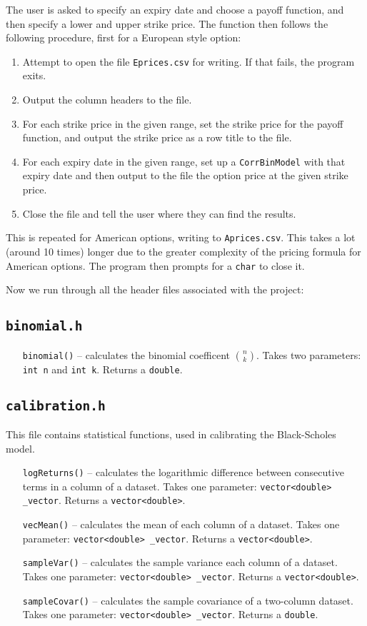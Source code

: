 \documentclass[12pt,a4paper]{article}
\begin{document}
The user is asked to specify an expiry date and choose a payoff function, and 
then specify a lower and upper strike price. The function then follows the 
following procedure, first for a European style option: 
\begin{enumerate}
	\item Attempt to open the file \texttt{Eprices.csv} for writing. If that fails, 
the program exits.
	\item Output the column headers to the file.
	\item For each strike price in the given range, set the strike price for the 
payoff function, and output the strike price as a row title to the file.
	\item For each expiry date in the given range, set up a \texttt{CorrBinModel} 
with that expiry date and then output to the file the option price at the given 
strike price.
	\item Close the file and tell the user where they can find the results.
\end{enumerate} 
This is repeated for American options, writing to \texttt{Aprices.csv}. This 
takes a lot (around 10 times) longer due to the greater complexity of the 
pricing formula for American options. The program then prompts for a 
\texttt{char} to close it.


Now we run through all the header files associated with the project:
\subsection{\texttt{binomial.h}}
\begin{itemize}
	\item[\texttt{binomial()}] -- calculates the binomial coefficent ${n\choose 
k}$. Takes two parameters: \texttt{int n} and \texttt{int k}. Returns a 
\texttt{double}.
\end{itemize}

\subsection{\texttt{calibration.h}}
This file contains statistical functions, used in calibrating the Black-Scholes 
model.
\begin{itemize}
	\item[\texttt{logReturns()}] -- calculates the logarithmic difference between 
consecutive terms in a column of a dataset. Takes one parameter: 
\texttt{vector<double> \_vector}. Returns a \texttt{vector<double>}.
	\item[\texttt{vecMean()}] -- calculates the mean of each column of a dataset. 
Takes one parameter: \texttt{vector<double> \_vector}. Returns a 
\texttt{vector<double>}.
	\item[\texttt{sampleVar()}] -- calculates the sample variance each column of a 
dataset. Takes one parameter: \texttt{vector<double> \_vector}. Returns a 
\texttt{vector<double>}.
	\item[\texttt{sampleCovar()}] -- calculates the sample covariance of a 
two-column dataset. Takes one parameter: \texttt{vector<double> \_vector}. 
Returns a \texttt{double}.
\end{itemize}
\end{document}
